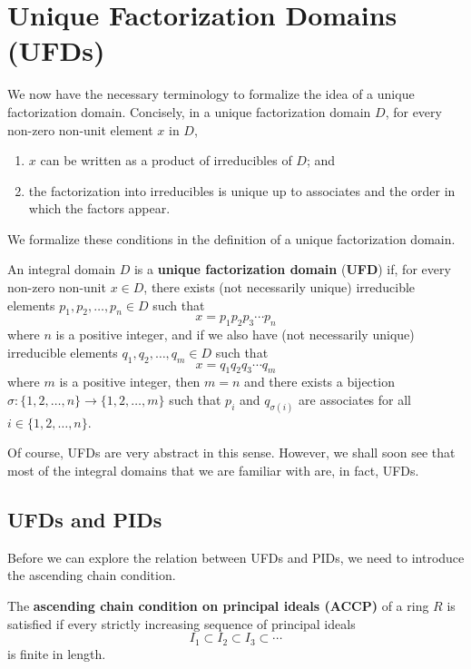 \section{Unique Factorization Domains (UFDs)}
We now have the necessary terminology to formalize the idea of a unique factorization domain. Concisely, in a unique factorization domain $D$, for every non-zero non-unit element $x$ in $D$,
\begin{enumerate}
    \item $x$ can be written as a product of irreducibles of $D$; and
    \item the factorization into irreducibles is unique up to associates and the order in which the factors appear.
\end{enumerate}

We formalize these conditions in the definition of a unique factorization domain.

\begin{definition}
    An integral domain $D$ is a \textbf{unique factorization domain} (\textbf{UFD}) if, for every non-zero non-unit $x \in D$, there exists (not necessarily unique) irreducible elements $p_1, p_2, \dots, p_n \in D$ such that
    \[
        x = p_1p_2p_3\cdots p_n
    \]
    where $n$ is a positive integer, and if we also have (not necessarily unique) irreducible elements $q_1, q_2, \dots, q_m \in D$ such that
    \[
        x = q_1q_2q_3\cdots q_m
    \]
    where $m$ is a positive integer, then $m = n$ and there exists a bijection $\sigma: \{1,2,\dots,n\} \to \{1,2,\dots,m\}$ such that $p_i$ and $q_{\sigma(i)}$ are associates for all $i \in \{1,2,\dots,n\}$.
\end{definition}

Of course, UFDs are very abstract in this sense. However, we shall soon see that most of the integral domains that we are familiar with are, in fact, UFDs.

\subsection{UFDs and PIDs}
Before we can explore the relation between UFDs and PIDs, we need to introduce the ascending chain condition.

\begin{definition}
    The \textbf{ascending chain condition on principal ideals (ACCP)} of a ring $R$ is satisfied if every strictly increasing sequence of principal ideals
    \[
        I_1 \subset I_2 \subset I_3 \subset \cdots
    \]
    is finite in length.
\end{definition}


